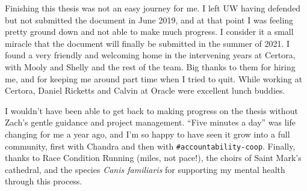 {Finishing this thesis was not an easy journey for me.
I left UW having defended but not submitted the document in June 2019,
and at that point I was feeling pretty ground down and not able to make much progress.
I consider it a small miracle that the document will finally be submitted in the summer of 2021.
I found a very friendly and welcoming home in the intervening years at Certora,
with Mooly and Shelly and the rest of the team.
Big thanks to them for hiring me, and for keeping me around part time when I tried to quit.
While working at Certora, Daniel Ricketts and Calvin at Oracle were excellent lunch buddies.

I wouldn't have been able to get back to making progress on the thesis without Zach's gentle guidance and project management.
``Five minutes a day'' was life changing for me a year ago,
and I'm so happy to have seen it grow into a full community, first with Chandra and then with \texttt{\#accountability-coop}.
Finally, thanks to Race Condition Running (miles, not pace!), the choirs of Saint Mark's cathedral,
and the species \emph{Canis familiaris} for supporting my mental health through this process.

}
